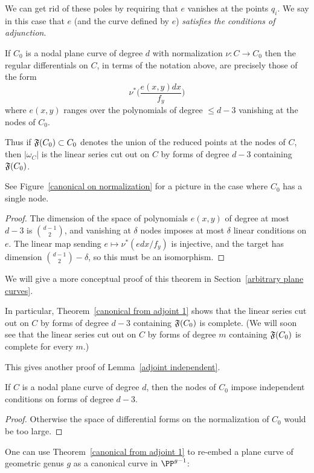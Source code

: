 We can get rid of these poles by requiring that $e$ vanishes at the points $q_i$. We say in this case that $e$ (and the curve defined by $e$) \emph{satisfies the conditions of adjunction}. 

\begin{theorem}\label{canonical from adjoint 1}
If $C_{0}$ is a nodal plane curve of degree $d$ with normalization $\nu: C\to C_{0}$
then the  regular differentials on  $C$, in terms of the notation above, 
 are precisely those of the form
 $$
\nu^{*}\biggl( \frac{e(x,y)dx}{f_{y}}\biggr)
$$
where 
$e(x,y)$ ranges over the polynomials of degree $\leq d-3$
vanishing at the nodes of $C_{0}.$

Thus if $\adj(C_{0})\subset C_{0}$ denotes the union
of the reduced points at the nodes of $C$, then $|\omega_{C}|$ is the linear series cut out on $C$ by 
forms of degree $d-3$ containing $\adj(C_{0})$.
\end{theorem}
See Figure~\ref{canonical on normalization} for a picture in the case where $C_0$ has a single node.
\begin{proof}
The dimension of the space of polynomials $e(x,y)$ of degree at most $d-3$ is $\binom{d-1}{2}$,
and vanishing at $\delta$ nodes imposes at most $\delta$ linear conditions on $e$. The linear map sending
$e\mapsto \nu^{*}(edx/f_{y})$ is injective, and the target has dimension 
$\binom{d-1}{2}-\delta$, so this must be an isomorphism.
\end{proof}
We will give a more conceptual proof of this theorem in Section~\ref{arbitrary plane curves}.

In particular, Theorem~\ref{canonical from adjoint 1}
shows that the linear series cut out on $C$ by 
forms of degree $d-3$ containing $\adj(C_{0})$ is complete. (We will soon see that
 the linear series cut out on $C$ by 
forms of degree $m$ containing $\adj(C_{0})$ is complete for every $m$.)


This gives another proof of Lemma~\ref{adjoint independent}.

\begin{corollary}
If $C$ is a nodal plane curve of degree $d$, then the nodes of $C_{0}$ impose independent
conditions on forms of degree $d-3$.
\end{corollary}
\begin{proof}
 Otherwise the space of differential forms on the normalization of $C_{0}$ would be too large.
\end{proof}

One can use Theorem~\ref{canonical from adjoint 1} to re-embed a plane curve of 
geometric genus $g$ as a canonical
curve in $\PP^{g-1}$:

